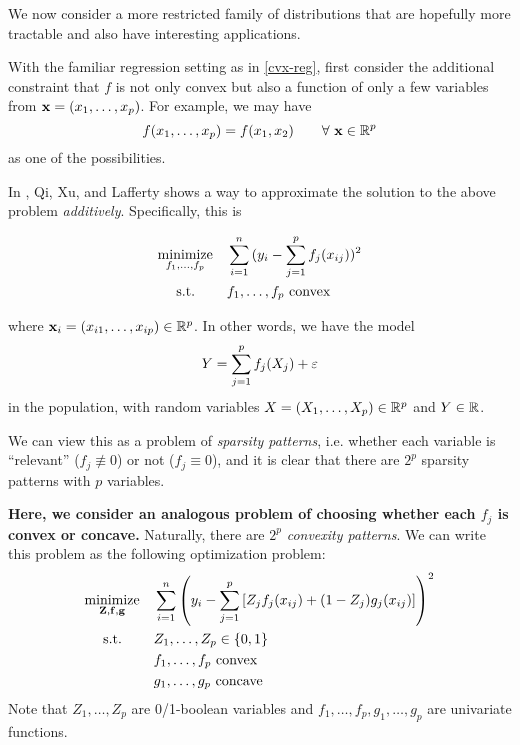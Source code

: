 \documentclass[11pt]{article}
\newcommand{\optprob}[5]
{
	\begin{equation}\label{#5}
	\begin{aligned}
	& \underset{#2}{\text{#1}}
	& & #3 \\
	& \text{\quad\ s.t.}
	& & #4
	\end{aligned}
	\end{equation}
}
\begin{document}
We now consider a more restricted family of distributions that are hopefully more tractable and also have interesting applications.

With the familiar regression setting as in \eqref{cvx-reg}, first consider the additional constraint that $f$ is not only convex but also a function of only a few variables from ${\bf x} = (x_1, \dotsc, x_p)$. For example, we may have
\[
f(x_1, \dotsc, x_p) = f(x_1, x_2) \qquad \forall\ {\bf x} \in {\mathbb R}^p
\]
as one of the possibilities. 

In \cite{DCM}, Qi, Xu, and Lafferty shows a way to approximate the solution to the above problem \emph{additively}. Specifically, this is 
\optprob{minimize}{f_1, \dotsc, f_p}{\sum_{i=1}^n{(y_i - \sum_{j=1}^p f_j(x_{ij}))^2}}{f_1, \dotsc, f_p \text{ convex}}{cvx-additive-reg}
where ${\bf x}_i = (x_{i1}, \dotsc, x_{ip}) \in {\mathbb R}^p$. In other words, we have the model
\[
Y = \sum_{j=1}^p f_j(X_j) + \varepsilon
\]
in the population, with random variables $X = (X_1, \dotsc, X_p) \in {\mathbb R}^p$ and $Y \in {\mathbb R}$.

We can view this as a problem of \emph{sparsity patterns}, i.e. whether each variable is ``relevant'' ($f_j \not\equiv 0$) or not ($f_j \equiv 0$), and it is clear that there are $2^p$ sparsity patterns with $p$ variables.

\textbf{Here, we consider an analogous problem of choosing whether each $f_j$ is convex or concave.} Naturally, there are $2^p$ \emph{convexity patterns}. We can write this problem as the following optimization problem:
\begin{equation}\label{cvx-pattern}
\begin{aligned}
& \underset{{\bf Z}, {\bf f}, {\bf g}}{\text{minimize}}
& & \sum_{i=1}^n \left(y_i - \sum_{j=1}^p\left[Z_jf_j(x_{ij}) + (1-Z_j)g_j(x_{ij})\right]\right)^2 \\
& \text{\quad\ s.t.}
& & Z_1, \dotsc, Z_p \in \{0,1\} \\
& & & f_1, \dotsc, f_p \text{ convex} \\
& & & g_1, \dotsc, g_p \text{ concave} 
\end{aligned}
\end{equation}
Note that $Z_1, \dotsc, Z_p$ are 0/1-boolean variables and $f_1, \dotsc, f_p, g_1, \dotsc, g_p$ are univariate functions.
\end{document}
